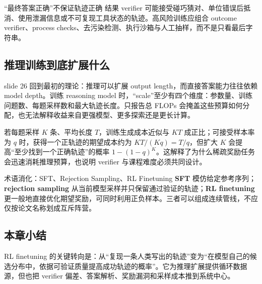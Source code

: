 
\begin{warningbox}{“最终答案正确”不保证轨迹正确}
结果 verifier 可能接受碰巧猜对、单位错误后抵消、使用泄漏信息或不可复现工具状态的轨迹。高风险训练应组合 outcome verifier、process checks、去污染检测、执行沙箱与人工抽样，而不是只看最后字符串。
\end{warningbox}


\subsection{推理训练到底扩展什么}

slide 26 回到最初的理论：推理可以扩展 output length，而直接答案能力往往依赖 model depth。训练 reasoning model 时，“scale”至少有四个维度：参数量、训练问题数、每题采样数和最大轨迹长度。只报告总 FLOPs 会掩盖这些预算如何分配，也无法解释收益来自更强模型、更多探索还是更长计算。


若每题采样 $K$ 条、平均长度 $T$，训练生成成本近似与 $KT$ 成正比；可接受样本率为 $q$ 时，获得一个正轨迹的期望成本约为 $KT/(Kq)=T/q$，但扩大 $K$ 会提高“至少找到一个正确轨迹”的概率 $1-(1-q)^K$。这解释了为什么稀疏奖励任务会迅速消耗推理预算，也说明 verifier 与课程难度必须共同设计。

\begin{knowledgebox}{术语消化：SFT、Rejection Sampling、RL Finetuning}
\textbf{SFT} 模仿给定参考序列；\textbf{rejection sampling} 从当前模型采样并只保留通过验证的轨迹；\textbf{RL finetuning} 更一般地直接优化期望奖励，可同时利用正负样本。三者可以组成连续管线，不应仅按论文名称划成互斥阵营。
\end{knowledgebox}

\subsection{本章小结}

RL finetuning 的关键转向是：从“复现一条人类写出的轨迹”变为“在模型自己的候选分布中，依据可验证质量提高成功轨迹的概率”。它为推理扩展提供循环数据源，但也把 verifier 偏差、答案解析、奖励漏洞和采样成本推到系统中心。

